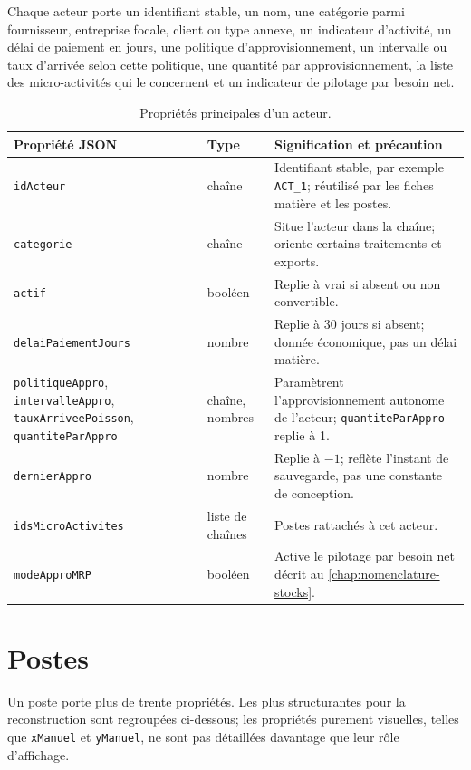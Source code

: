 Chaque acteur porte un identifiant stable, un nom, une catégorie parmi fournisseur, entreprise focale, client ou type annexe, un indicateur d'activité, un délai de paiement en jours, une politique d'approvisionnement, un intervalle ou taux d'arrivée selon cette politique, une quantité par approvisionnement, la liste des micro-activités qui le concernent et un indicateur de pilotage par besoin net.

\begin{table}[H]
  \centering
  \small
  \begin{tabularx}{\textwidth}{L{0.20\textwidth} L{0.10\textwidth} Y}
    \toprule
    Propriété JSON & Type & Signification et précaution \\
    \midrule
    \texttt{idActeur} & chaîne & Identifiant stable, par exemple \texttt{ACT\_1}; réutilisé par les fiches matière et les postes. \\
    \texttt{categorie} & chaîne & Situe l'acteur dans la chaîne; oriente certains traitements et exports. \\
    \texttt{actif} & booléen & Replie à vrai si absent ou non convertible. \\
    \texttt{delaiPaiementJours} & nombre & Replie à 30 jours si absent; donnée économique, pas un délai matière. \\
    \texttt{politiqueAppro}, \texttt{intervalleAppro}, \texttt{tauxArriveePoisson}, \texttt{quantiteParAppro} & chaîne, nombres & Paramètrent l'approvisionnement autonome de l'acteur; \texttt{quantiteParAppro} replie à 1. \\
    \texttt{dernierAppro} & nombre & Replie à $-1$; reflète l'instant de sauvegarde, pas une constante de conception. \\
    \texttt{idsMicroActivites} & liste de chaînes & Postes rattachés à cet acteur. \\
    \texttt{modeApproMRP} & booléen & Active le pilotage par besoin net décrit au \cref{chap:nomenclature-stocks}. \\
    \bottomrule
  \end{tabularx}
  \caption{Propriétés principales d'un acteur.}
  \label{tab:json-acteurs}
\end{table}

\section{Postes}

Un poste porte plus de trente propriétés. Les plus structurantes pour la reconstruction sont regroupées ci-dessous; les propriétés purement visuelles, telles que \texttt{xManuel} et \texttt{yManuel}, ne sont pas détaillées davantage que leur rôle d'affichage.

